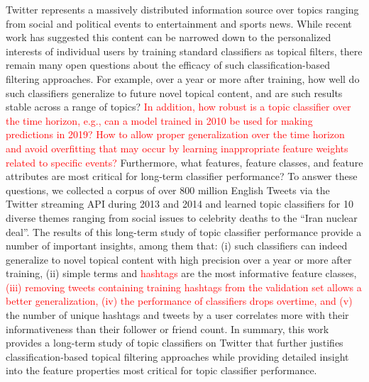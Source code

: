 Twitter represents a massively distributed information source over topics ranging from social and political events to entertainment and sports news.  While recent work has suggested this content can be narrowed down to the personalized interests of individual users by training standard classifiers as topical filters, there remain many open questions about the efficacy of such classification-based filtering approaches.  For example, over a year or more after training, how well do such classifiers generalize to future novel topical content, and are such results stable across a range of topics? \textcolor{red}{In addition, how robust is a topic classifier over the time horizon, e.g., can a model trained in 2010 be used for making predictions in 2019? How to allow proper generalization over the  time horizon and avoid overfitting that may occur by learning inappropriate feature weights related to specific events?} Furthermore, what features, feature classes, and feature attributes are most critical for long-term classifier performance?  To answer these questions, we collected a corpus of over 800 million English Tweets via the Twitter streaming API during 2013 and 2014 and learned topic classifiers for 10 diverse themes ranging from social issues to celebrity deaths to the ``Iran nuclear deal''.  The results of this long-term study of topic classifier performance provide a number of important insights, among them that: (i) such classifiers can indeed generalize to novel topical content with high precision over a year or more after training, (ii) simple terms and \textcolor{red}{hashtags} are the most informative feature classes, \textcolor{red}{(iii) removing tweets containing training hashtags from the validation set allows a better generalization, (iv) the performance of classifiers drops overtime, and (v)} the number of unique hashtags and tweets by a user correlates more with their informativeness than their follower or friend count.  In summary, this work provides a long-term study of topic classifiers on Twitter that further justifies classification-based topical filtering approaches while providing detailed insight into the feature properties most critical for topic classifier performance.
